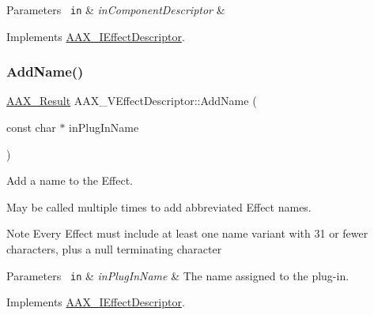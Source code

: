 \begin{DoxyParams}[1]{Parameters}
\mbox{\texttt{ in}}  & {\em in\+Component\+Descriptor} & \\
\hline
\end{DoxyParams}


Implements \mbox{\hyperlink{a01813_aec33938f50461dd5e7c1dcc25faf6917}{A\+A\+X\+\_\+\+I\+Effect\+Descriptor}}.

\mbox{\label{a01913_ac52fc7b9a0f8bd5550725c5096aa2926}} 
\subsubsection{\texorpdfstring{AddName()}{AddName()}}
{\footnotesize\ttfamily \mbox{\hyperlink{a00392_a4d8f69a697df7f70c3a8e9b8ee130d2f}{A\+A\+X\+\_\+\+Result}} A\+A\+X\+\_\+\+V\+Effect\+Descriptor\+::\+Add\+Name (\begin{DoxyParamCaption}\item[{const char $\ast$}]{in\+Plug\+In\+Name }\end{DoxyParamCaption})\hspace{0.3cm}{\ttfamily [virtual]}}



Add a name to the Effect. 

May be called multiple times to add abbreviated Effect names.

\begin{DoxyNote}{Note}
Every Effect must include at least one name variant with 31 or fewer characters, plus a null terminating character
\end{DoxyNote}

\begin{DoxyParams}[1]{Parameters}
\mbox{\texttt{ in}}  & {\em in\+Plug\+In\+Name} & The name assigned to the plug-\/in. \\
\hline
\end{DoxyParams}


Implements \mbox{\hyperlink{a01813_a0d3a0e258050524ba6fbc354f16df207}{A\+A\+X\+\_\+\+I\+Effect\+Descriptor}}.

\mbox{\label{a01913_af0f874b5d7dd2a89b3c35eb6b73d9f53}} 
